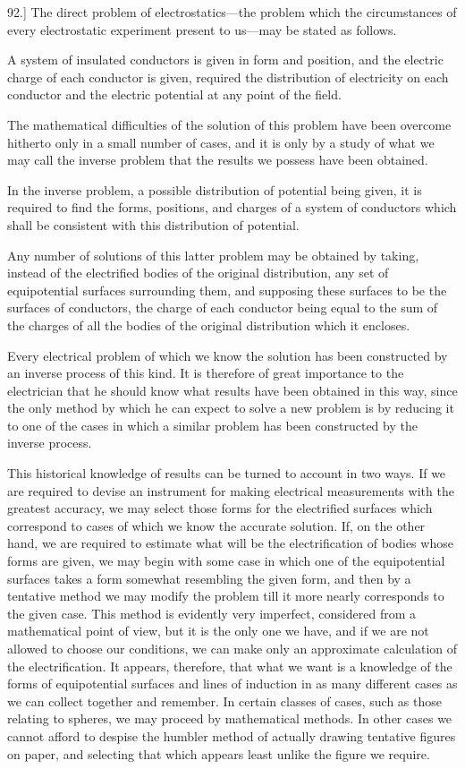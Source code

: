 \documentclass[12pt,oneside]{book}[2021/10/04]
\newcommand{\Runhead}[1]{\fancyhead[C]{\iffloatpage{}{\small#1}}}
\newcommand{\article}[1]{\phantomsection \label{art:#1}{#1.]}}
\newcommand{\¬}{\hphantom{0}}
\begin{document}
\article{92} The direct problem of electrostatics---the problem which
the circumstances of every electrostatic experiment present to us---may
be stated as follows.

A system of insulated conductors is given in form and position,
and the electric charge of each conductor is given, required the
distribution of electricity on each conductor and the electric potential
at any point of the field.

The mathematical difficulties of the solution of this problem have
been overcome hitherto only in a small number of cases, and it is
only by a study of what we may call the inverse problem that the
results we possess have been obtained.

In the inverse problem, a possible distribution of potential
being given, it is required to find the forms, positions, and charges
of a system of conductors which shall be consistent with this distribution
of potential.
\Runhead{INVERSE PROBLEM OF ELECTROSTATICS.}

Any number of solutions of this latter problem may be obtained
by taking, instead of the electrified bodies of the original distribution,
any set of equipotential surfaces surrounding them, and supposing
these surfaces to be the surfaces of conductors, the charge of each
conductor being equal to the sum of the charges of all the bodies
of the original distribution which it encloses.

Every electrical problem of which we know the solution has been
constructed by an inverse process of this kind. It is therefore of
great importance to the electrician that he should know what results
have been obtained in this way, since the only method by which he
can expect to solve a new problem is by reducing it to one of the
cases in which a similar problem has been constructed by the
inverse process.

This historical knowledge of results can be turned to account in
two ways. If we are required to devise an instrument for making
electrical measurements with the greatest accuracy, we may select
those forms for the electrified surfaces which correspond to cases of
which we know the accurate solution. If, on the other hand, we
are required to estimate what will be the electrification of bodies
whose forms are given, we may begin with some case in which
one of the equipotential surfaces takes a form somewhat resembling
the given form, and then by a tentative method we may
modify the problem till it more nearly corresponds to the given
case. This method is evidently very imperfect, considered from a
mathematical point of view, but it is the only one we have, and if
we are not allowed to choose our conditions, we can make only an
approximate calculation of the electrification. It appears, therefore,
that what we want is a knowledge of the forms of equipotential
surfaces and lines of induction in as many different cases as we can
collect together and remember. In certain classes of cases, such
as those relating to spheres, we may proceed by mathematical
methods. In other cases we cannot afford to despise the humbler
method of actually drawing tentative figures on paper, and selecting
that which appears least unlike the figure we require.
\end{document}
